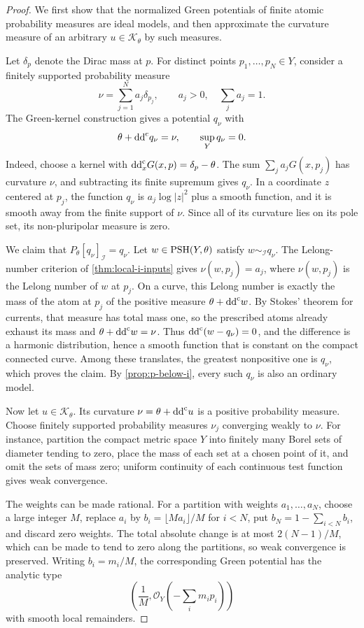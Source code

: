 \begin{proof}
We first show that the normalized Green potentials of finite atomic probability measures are ideal models, and then approximate the curvature measure of an arbitrary $u\in\mathcal K_\theta$ by such measures.

Let $\delta_p$ denote the Dirac mass at $p$. For distinct points $p_1,\ldots,p_N\in Y$, consider a finitely supported probability measure
\[
 \nu=\sum_{j=1}^N a_j\delta_{p_j},\qquad a_j>0,\quad\sum_j a_j=1.
\]
The Green-kernel construction gives a potential $q_\nu$ with
\[
 \theta+\mathrm{dd}^{\mathrm{c}} q_\nu=\nu,\qquad\sup_Yq_\nu=0.
\]
Indeed, choose a kernel with $\mathrm{dd}^{\mathrm{c}}_xG(x,p)=\delta_p-\theta$. The sum $\sum_j a_jG(x,p_j)$ has curvature $\nu$, and subtracting its finite supremum gives $q_\nu$. In a coordinate $z$ centered at $p_j$, the function $q_\nu$ is $a_j\log|z|^2$ plus a smooth function, and it is smooth away from the finite support of $\nu$. Since all of its curvature lies on its pole set, its non-pluripolar measure is zero.

We claim that $P_\theta[q_\nu]_{\mathcal I}=q_\nu$. Let $w\in\mathrm{PSH}(Y,\theta)$ satisfy $w\sim_{\mathcal I}q_\nu$. The Lelong-number criterion of \cref{thm:local-i-inputs} gives $\nu(w,p_j)=a_j$, where $\nu(w,p_j)$ is the Lelong number of $w$ at $p_j$. On a curve, this Lelong number is exactly the mass of the atom at $p_j$ of the positive measure $\theta+\mathrm{dd}^{\mathrm{c}} w$. By Stokes' theorem for currents, that measure has total mass one, so the prescribed atoms already exhaust its mass and $\theta+\mathrm{dd}^{\mathrm{c}} w=\nu$. Thus $\mathrm{dd}^{\mathrm{c}}(w-q_\nu)=0$, and the difference is a harmonic distribution, hence a smooth function that is constant on the compact connected curve. Among these translates, the greatest nonpositive one is $q_\nu$, which proves the claim. By \cref{prop:p-below-i}, every such $q_\nu$ is also an ordinary model.

Now let $u\in\mathcal K_\theta$. Its curvature $\nu=\theta+\mathrm{dd}^{\mathrm{c}} u$ is a positive probability measure. Choose finitely supported probability measures $\nu_j$ converging weakly to $\nu$. For instance, partition the compact metric space $Y$ into finitely many Borel sets of diameter tending to zero, place the mass of each set at a chosen point of it, and omit the sets of mass zero; uniform continuity of each continuous test function gives weak convergence.

The weights can be made rational. For a partition with weights $a_1,\ldots,a_N$, choose a large integer $M$, replace $a_i$ by $b_i=\lfloor Ma_i\rfloor/M$ for $i<N$, put $b_N=1-\sum_{i<N}b_i$, and discard zero weights. The total absolute change is at most $2(N-1)/M$, which can be made to tend to zero along the partitions, so weak convergence is preserved. Writing $b_i=m_i/M$, the corresponding Green potential has the analytic type
\[
 \left(\frac1M,\mathcal O_Y\left(-\sum_i m_i p_i\right)\right)
\]
with smooth local remainders.


\end{proof}
